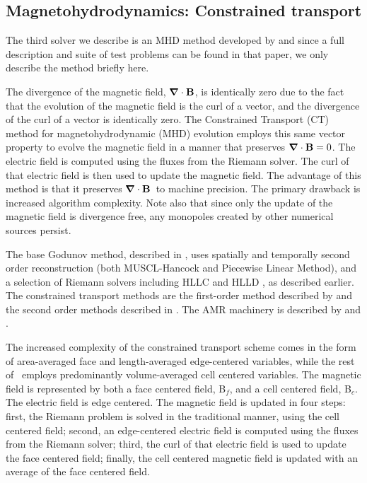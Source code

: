 \subsection{Magnetohydrodynamics: Constrained transport}
\label{sec.num.mhd-ct}
\def\Bvec{{\bf B}}
\def\Bf{Bf}
\def\Bc{Bc}
\def\Evec{{\bf E}}
\def\Divb{\ensuremath{\div \Bvec}}

The third solver we describe is an MHD method developed by 
\citet{Collins10} and since a full description and suite of test problems can be
found in that paper, we only describe the method briefly here.

The divergence of the magnetic field, \Divb, is
identically zero due to the fact that the evolution of the magnetic field is the
curl of a vector, and the divergence of the curl of a vector is identically
zero.
The Constrained Transport (CT) method \citep{Evans88, Balsara99} for
magnetohydrodynamic (MHD) evolution employs this same vector property
to evolve the magnetic field in a manner that preserves $\Divb=0$.  
The electric field is computed using
the fluxes from the Riemann solver.  The curl of that electric field
is then used to update the magnetic field.  The advantage of this
method is that it preserves \Divb\ to machine precision.  The primary
drawback is increased algorithm complexity.  Note also that since 
only the update of the magnetic field is divergence free, any monopoles 
created by other numerical sources persist.

The base Godunov method, described in \citet{Li08a}, uses spatially and
temporally second order reconstruction (both MUSCL-Hancock and
Piecewise Linear Method), and a selection of Riemann solvers including
HLLC and HLLD \citep{Mignone07}, as described earlier.  
The constrained transport methods
are the first-order method described by \citet{Balsara99} and the
second order methods described in \citet{Gardiner05}.  The AMR
machinery is described by \citet{Balsara01} and \citet{Collins10}.

The increased complexity of the constrained transport scheme comes in
the form of area-averaged face and length-averaged edge-centered
variables, while the rest of \enzo\ employs predominantly
volume-averaged cell centered variables.  The magnetic field is
represented by both a face centered field, B$_f$, and a cell centered
field, B$_c$.  The electric field is edge centered.  The magnetic
field is updated in four steps: first, the Riemann problem is solved
in the traditional manner, using the cell centered field; second, an
edge-centered electric field is computed using the fluxes from the
Riemann solver; third, the curl of that electric field is used to
update the face centered field; finally, the cell centered magnetic
field is updated with an average of the face centered field.

